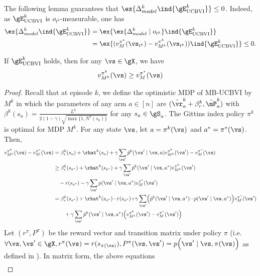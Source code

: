 \begin{subappendices}
The following lemma guarantees that $\ex{\Delta_{model}^k \ind{\gE^{k}_\text{UCBVI}}}\le0$. Indeed, as $\gE^{k}_\text{UCBVI}$ is $o_{t^k}$-measurable, one has 
\begin{align*}
    \ex{\Delta_{model}^k\ind{\gE^{k}_\text{UCBVI}}} &= \ex{\ex{\Delta_{model}^k\mid o_{t^k}}\ind{\gE^{k}_\text{UCBVI}}}\\
    &=\ex{(v_M^{\pi^*}(\vs_{t^k}) - v_{M^k}^{\pi^k}(\vs_{t^k}))\ind{\gE^{k}_\text{UCBVI}}} \le 0.
\end{align*}
\begin{lem}
    \label{lem:ucbvi_optim}
   If $\gE^{k}_\text{UCBVI}$ holds, then for any $\vs\in\gX$, we have
   \begin{align*}
       v_{M^k}^{\pi^k}(\vs) \ge v_{M}^{\pi^*}(\vs)
    \end{align*}
\end{lem}
\begin{proof}
    Recall that at episode $k$, we define the optimistic MDP of MB-UCBVI by $M^k$ in which the parameters of any arm $a\in[n]$ are $(\hat{\vr}^{k}_a +\beta^{k}_r, \hat{\mP}^{k}_a)$ with $\beta^k(s_a){=}\frac{L^{k}}{2(1-\gamma)\sqrt{\max\{1,N^{k}(s_a)\} }}$ for any $s_a\in\gS_a$.
The Gittins index policy $\pi^k$ is optimal for MDP $M^k$.
For any state $\vs$, let $a=\pi^k(\vs)$ and $a^*=\pi^*(\vs)$.
Then,
\begin{align*}
    v_{M^k}^{\pi^k}(\vs) -v_M^{\pi^*}(\vs)
    &= \beta^k_r(s_a) +\rhat^{k}(s_a) +\gamma\sum_{\vs'}\hat{p}^{k}(\vs'\mid \vs,a)v_{M^k}^{\pi^k}(\vs') -v_M^{\pi^*}(\vs)\\ 
    &\ge \beta^{k}_r(s_{a^*}) +\rhat^{k}(s_{a^*}) +\gamma\sum_{\vs'}\hat{p}^{k}(\vs'\mid \vs,a^*)v_{M^k}^{\pi^k}(\vs') \\
    &\quad -r(s_{a^*}) -\gamma\sum_{\vs'}p(\vs'\mid \vs,a^*)v_M^{\pi^*}(\vs') \\
    &= \beta^{k}_r(s_{a^*}) +\rhat^{k}(s_{a^*}) {-}r(s_{a^*}) {+}\gamma\sum_{\vs'}\Bigl(\hat{p}^{k}(\vs'\mid \vs,a^*) {-}p(\vs'\mid \vs,a^*)\Bigr)v_M^{\pi^*}(\vs') \\
    &\qquad +\gamma \sum_{\vs'}\hat{p}^{k}(\vs'\mid \vs,a^*)\Bigl(v_{M^k}^{\pi^k}(\vs') -v_M^{\pi^*}(\vs')\Bigr)
\end{align*}
Let $(r^{\pi}, P^{\pi})$ be the reward vector and transition matrix under policy $\pi$ (i.e. $\forall \vs, \vs'\in\gX, r^{\pi}(\vs)=r(s_{\pi(\vs)}), P^{\pi}(\vs,\vs')=p\Bigl( \vs'\mid \vs,\pi(\vs)\Bigr)$ as defined in ).
In matrix form, the above equations
\begin{align*}

\end{align*}
\end{proof}
\end{subappendices}

